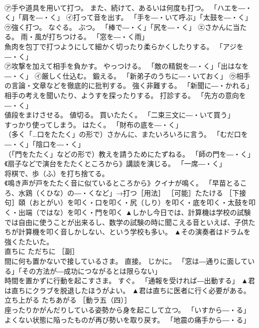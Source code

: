 \documentclass[8pt]{extreport}
\begin{document}
\begin{CJK}{UTF8}{min}
\\	㋐手や道具を用いて打つ。 また、続けて、あるいは何度も打つ。 「ハエを―・く」「肩を―・く」 ㋑打って音を出す。 「手を―・いて呼ぶ」「太鼓を―・く」 ㋒強く打つ。 なぐる。 ぶつ。 「棒で―・く」「尻を―・く」 ㋓さかんに当たる。 雨・風が打ちつける。 「窓を―・く雨」 
\\	魚肉を包丁で打つようにして細かく切ったり柔らかくしたりする。 「アジを―・く」 
\\	㋐攻撃を加えて相手を負かす。 やっつける。 「敵の精鋭を―・く」「出はなを―・く」 ㋑厳しく仕込む。 鍛える。 「新弟子のうちに―・いておく」 ㋒相手の言論・文章などを徹底的に批判する。 強く非難する。 「新聞に―・かれる」 
\\	相手の考えを聞いたり、ようすを探ったりする。 打診する。 「先方の意向を―・く」 
\\	値段をまけさせる。 値切る。 買いたたく。 「二束三文に―・いて買う」 
\\	すっかり使ってしまう。 はたく。 「財布の底を―・く」 
\\	（多く「…口をたたく」の形で）さかんに、またいろいろに言う。 「むだ口を―・く」「陰口を―・く」 
\\	（「門をたたく」などの形で）教えを請うためにたずねる。 「師の門を―・く」 
\\	《扇子などで演台をたたくところから》講談を演じる。 「一席―・く」 
\\	将棋で、歩（ふ）を打ち捨てる。 
\\	《鳴き声が戸をたたく音に似ているところから》クイナが鳴く。 「早苗とるころ、水鶏（くひな）の―・くなど」→打つ［用法］ ［可能］たたける ［下接句］頤（おとがい）を叩く・口を叩く・尻（しり）を叩く・底を叩く・太鼓を叩く・出端（ではな）を叩く・門を叩く	▲しかし今日では、計算機は学校の試験では自由に使うことが出来るし、数学の試験の時に聞こえる音といえば、子供たちが計算機を叩く音しかしない、という学校も多い。 ▲その演奏者はドラムを強くたたいた。
\\	直ちに	ただちに	［副］ 
\\	間に何も置かないで接しているさま。 直接。 じかに。 「窓は―通りに面している」「その方法が―成功につながるとは限らない」 
\\	時間を置かずに行動を起こすさま。 すぐ。 「通報を受ければ―出動する」	▲君は直ちにクラブを脱退したほうがよい。 ▲君は直ちに医者に行く必要がある。
\\	立ち上がる	たちあがる	［動ラ五（四）］ 
\\	座ったりかがんだりしている姿勢から身を起こして立つ。 「いすから―・る」 
\\	よくない状態に陥ったものが再び勢いを取り戻す。 「地震の痛手から―・る」 

\end{CJK}
\end{document}
